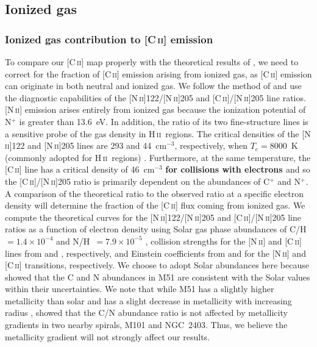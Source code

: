 \documentclass[preprint2]{aastex}
\begin{document}
\subsection{Ionized gas}\label{ionized_gas}
\subsubsection{Ionized gas contribution to [C\,\textsc{ii}] emission}\label{ionized_gas_contribution}
To compare our [C\,\textsc{ii}] map properly with the theoretical results of \citet{1999ApJ...527..795K, 2006ApJ...644..283K}, we need to correct for the fraction of [C\,\textsc{ii}] emission arising from ionized gas, as [C\,\textsc{ii}] emission can originate in both neutral and ionized gas.  We follow the method of \citet{2006ApJ...652L.125O} and use the diagnostic capabilities of the [N\,\textsc{ii}]122/[N\,\textsc{ii}]205 and [C\,\textsc{ii}]/[N\,\textsc{ii}]205 line ratios. [N\,\textsc{ii}] emission arises entirely from ionized gas because the ionization potential of N$^{+}$ is greater than 13.6~eV. In addition, the ratio of its two fine-structure lines is a sensitive probe of the gas density in H\,\textsc{ii}~regions. The critical densities of the [N\,\textsc{ii}]122 and [N\,\textsc{ii}]205 lines are 293 and 44~cm$^{-3}$, respectively, when $T_{e} = 8000$~K (commonly adopted for H\,\textsc{ii}~regions) \citep[][]{2006ApJ...652L.125O}.  Furthermore, at the same temperature, the [C\,\textsc{ii}] line has a critical density of 46~cm$^{-3}$ \textbf{for collisions with electrons \citep[][]{2006ApJ...652L.125O}} and so the [C\,\textsc{ii}]/[N\,\textsc{ii}]205 ratio is primarily dependent on the abundances of C$^{+}$ and N$^{+}$. A comparison of the theoretical ratio to the observed ratio at a specific electron density will determine the fraction of the [C\,\textsc{ii}] flux coming from ionized gas.  We compute the theoretical curves for the [N\,\textsc{ii}]122/[N\,\textsc{ii}]205 and [C\,\textsc{ii}]/[N\,\textsc{ii}]205 line ratios as a function of electron density using Solar gas phase abundances of C/H~$= 1.4 \times 10^{-4}$ and N/H~$= 7.9 \times 10^{-5}$ \citep{1996ARA&A..34..279S}, collision strengths for the [N\,\textsc{ii}] and [C\,\textsc{ii}] lines from \citet{2004MNRAS.348.1275H} and \citet{1992ApJS...80..425B}, respectively, and Einstein coefficients from \citet{1997A&AS..123..159G} and \citet{1998A&AS..131..499G} for the [N\,\textsc{ii}] and [C\,\textsc{ii}] transitions, respectively.  We choose to adopt Solar abundances here because \citet{2004AJ....128.2772G} showed that the C and N abundances in M51 are consistent with the Solar values within their uncertainties.  We note that while M51 has a slightly higher metallicity than solar \citep{2009ARA&A..47..481A} and has a slight decrease in metallicity with increasing radius \citep{2010ApJS..190..233M,2012ApJ...755..165M}, \citet{1999ApJ...513..168G} showed that the C/N abundance ratio is not affected by metallicity gradients in two nearby spirals, M101 and NGC~2403.  Thus, we believe the metallicity gradient will not strongly affect our results.
\end{document}
